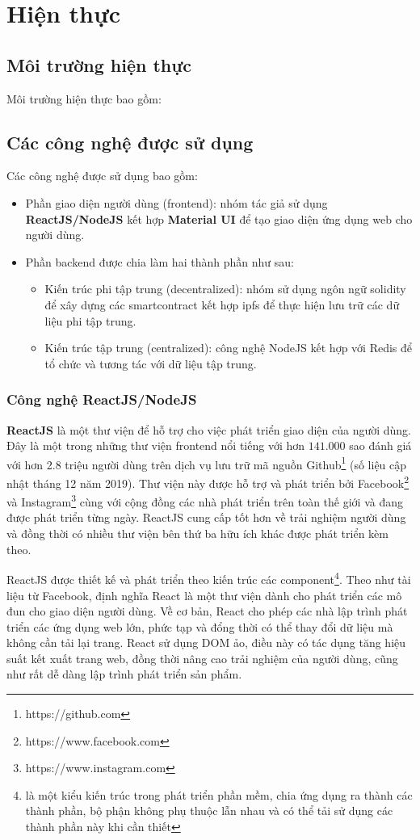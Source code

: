 \documentclass[../main-report.tex]{subfiles}
\begin{document}
\section{Hiện thực}
\subsection{Môi trường hiện thực}
Môi trường hiện thực bao gồm:

\subsection{Các công nghệ được sử dụng}
Các công nghệ được sử dụng bao gồm:
\begin{itemize}
\item Phần giao diện người dùng (\gls{frontend}): nhóm tác giả sử dụng \textbf{ReactJS/NodeJS} kết hợp \textbf{Material UI} để tạo giao diện ứng dụng web cho người dùng.
\item Phần \gls{backend} được chia làm hai thành phần như sau:
\begin{itemize}
 \item Kiến trúc phi tập trung (decentralized): nhóm sử dụng ngôn ngữ solidity để xây dựng các \gls{smartcontract} kết hợp \acrshort{ipfs} để thực hiện lưu trữ các dữ liệu phi tập trung.
 \item Kiến trúc tập trung (centralized): công nghệ NodeJS kết hợp với Redis để tổ chức và tương tác với dữ liệu tập trung.
 \end{itemize} 
\end{itemize}

\subsubsection{Công nghệ ReactJS/NodeJS}
\textbf{ReactJS} là một thư viện để hỗ trợ cho việc phát triển giao diện của người dùng. Đây là một trong những thư viện \gls{frontend} nổi tiếng với hơn $141.000$ sao đánh giá với hơn 2.8 triệu người dùng trên dịch vụ lưu trữ mã nguồn Github\footnote{https://github.com} (số liệu cập nhật tháng 12 năm 2019). Thư viện này được hỗ trợ và phát triển bởi Facebook\footnote{https://www.facebook.com} và Instagram\footnote{https://www.instagram.com} cùng với cộng đồng các nhà phát triển trên toàn thế giới và đang được phát triển từng ngày. ReactJS cung cấp tốt hơn về trải nghiệm người dùng và đồng thời có nhiều thư viện bên thứ ba hữu ích khác được phát triển kèm theo.

ReactJS được thiết kế và phát triển theo kiến trúc các component\footnote{là một kiểu kiến trúc trong phát triển phần mềm, chia ứng dụng ra thành các thành phần, bộ phận không phụ thuộc lẫn nhau và có thể tải sử dụng các thành phần này khi cần thiết}. Theo như tài liệu từ Facebook, định nghĩa React là một thư viện dành cho phát triển các mô đun cho giao diện người dùng. Về cơ bản, React cho phép các nhà lập trình phát triển các ứng dụng web lớn, phức tạp và đổng thời có thể thay đổi dữ liệu mà không cần tải lại trang. React sử dụng DOM ảo, điều này có tác dụng tăng hiệu suất kết xuất trang web, đồng thời nâng cao trải nghiệm của người dùng, cũng như rất dễ dàng lập trình phát triển sản phẩm.
\end{document}
